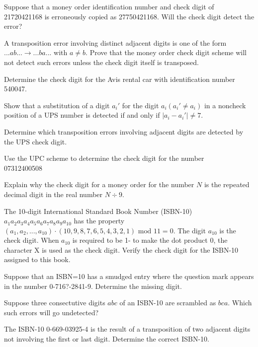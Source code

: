 \documentclass[11pt,largemargins]{homework}
\begin{document}
\question 
Suppose that a money order identification number and check digit of \\21720421168 is erroneously copied as 27750421168. 
Will the check digit detect the error?

\question 
A transposition error involving distinct adjacent digits is one of the form $...ab...\rightarrow...ba...$ with $a\neq b$. 
Prove that the money order check digit scheme will not detect such errors unless the check digit itself is transposed. 

\question 
Determine the check digit for the Avis rental car with identification number 540047.

\question 
Show that a substitution of a digit $a_i'$ for the digit $a_i(a_i'\neq a_i)$ in a noncheck position of a UPS number is 
detected if and only if $|a_i-a_i'|\neq 7$.

\question 
Determine which transposition errors involving adjacent digits are detected by the UPS check digit.

\question 
Use the UPC scheme to determine the check digit for the number\\ 07312400508

\question 
Explain why the check digit for a money order for the number $N$ is the repeated decimal digit in the real 
number $N\div 9$.

\question 
The 10-digit International Standard Book Number (ISBN-10)\\ $a_1a_2a_3a_4a_5a_6a_7a_8a_9a_{10}$ has the property \\
$(a_1, a_2, ..., a_{10})\cdot (10,9,8,7,6,5,4,3,2,1)\text{ mod }11=0$. The digit $a_{10}$ is the check digit. 
When $a_{10}$ is required to be 1- to make the dot product 0, the character X is used as the check digit.
Verify the check digit for the ISBN-10 assigned to this book.

\question 
Suppose that an ISBN=10 has a smudged entry where the question mark appears in the number 0-716?-2841-9.
Determine the missing digit.

\question 
Suppose three consectutive digits $abc$ of an ISBN-10 are scrambled as $bca$. Which such errors will go undetected?

\question 
The ISBN-10 0-669-03925-4 is the result of a transposition of two adjacent digits not involving the first or last digit. 
Determine the correct ISBN-10.
\end{document}
